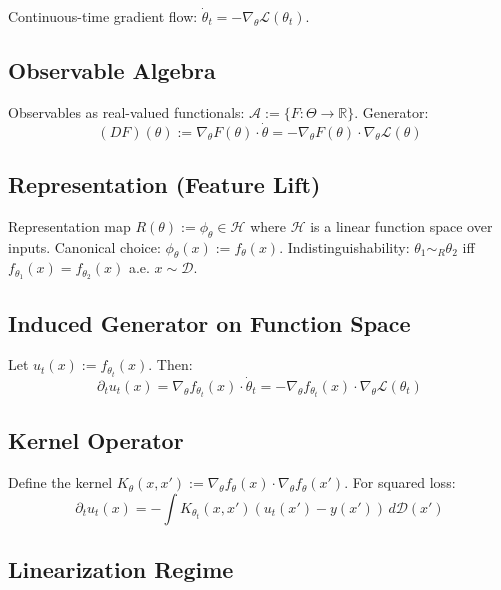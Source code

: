 \documentclass[12pt, oneside]{article}
\begin{document}
Continuous-time gradient flow: $\dot{\theta}_t = -\nabla_\theta \mathcal{L}(\theta_t)$.

\subsection{Observable Algebra}

Observables as real-valued functionals: $\mathcal{A} := \{ F: \Theta \rightarrow \mathbb{R} \}$. Generator:
\begin{equation}
(DF)(\theta) := \nabla_\theta F(\theta) \cdot \dot{\theta} = -\nabla_\theta F(\theta) \cdot \nabla_\theta \mathcal{L}(\theta)
\end{equation}

\subsection{Representation (Feature Lift)}

Representation map $R(\theta) := \phi_\theta \in \mathcal{H}$ where $\mathcal{H}$ is a linear function space over inputs. Canonical choice: $\phi_\theta(x) := f_\theta(x)$. Indistinguishability: $\theta_1 \sim_R \theta_2$ iff $f_{\theta_1}(x) = f_{\theta_2}(x)$ a.e. $x \sim \mathcal{D}$.

\subsection{Induced Generator on Function Space}

Let $u_t(x) := f_{\theta_t}(x)$. Then:
\begin{equation}
\partial_t u_t(x) = \nabla_\theta f_{\theta_t}(x) \cdot \dot{\theta}_t = -\nabla_\theta f_{\theta_t}(x) \cdot \nabla_\theta \mathcal{L}(\theta_t)
\end{equation}

\subsection{Kernel Operator}

Define the kernel $K_\theta(x,x') := \nabla_\theta f_\theta(x) \cdot \nabla_\theta f_\theta(x')$. For squared loss:
\begin{equation}
\partial_t u_t(x) = -\int K_{\theta_t}(x,x') (u_t(x') - y(x')) \, d\mathcal{D}(x')
\end{equation}

\subsection{Linearization Regime}
\end{document}
